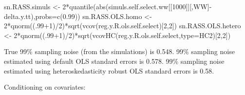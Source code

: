 \documentclass[
]{book}
\newenvironment{Shaded}{\begin{snugshade}}{\end{snugshade}}
\newcommand{\AttributeTok}[1]{\textcolor[rgb]{0.77,0.63,0.00}{#1}}
\newcommand{\DecValTok}[1]{\textcolor[rgb]{0.00,0.00,0.81}{#1}}
\newcommand{\FloatTok}[1]{\textcolor[rgb]{0.00,0.00,0.81}{#1}}
\newcommand{\FunctionTok}[1]{\textcolor[rgb]{0.00,0.00,0.00}{#1}}
\newcommand{\NormalTok}[1]{#1}
\newcommand{\OtherTok}[1]{\textcolor[rgb]{0.56,0.35,0.01}{#1}}
\newcommand{\SpecialCharTok}[1]{\textcolor[rgb]{0.00,0.00,0.00}{#1}}
\newcommand{\StringTok}[1]{\textcolor[rgb]{0.31,0.60,0.02}{#1}}
\theoremstyle{definition}
\theoremstyle{definition}
\theoremstyle{definition}
\theoremstyle{definition}
\theoremstyle{remark}
\begin{document}
\begin{Shaded}
\begin{Highlighting}[]
\NormalTok{sn.RASS.simuls }\OtherTok{\textless{}{-}} \DecValTok{2}\SpecialCharTok{*}\FunctionTok{quantile}\NormalTok{(}\FunctionTok{abs}\NormalTok{(simuls.self.select.ww[[}\StringTok{\textquotesingle{}1000\textquotesingle{}}\NormalTok{]][,}\StringTok{\textquotesingle{}WW\textquotesingle{}}\NormalTok{]}\SpecialCharTok{{-}}\NormalTok{delta.y.tt),}\AttributeTok{probs=}\FunctionTok{c}\NormalTok{(}\FloatTok{0.99}\NormalTok{))}
\NormalTok{sn.RASS.OLS.homo }\OtherTok{\textless{}{-}} \DecValTok{2}\SpecialCharTok{*}\FunctionTok{qnorm}\NormalTok{((.}\DecValTok{99}\SpecialCharTok{+}\DecValTok{1}\NormalTok{)}\SpecialCharTok{/}\DecValTok{2}\NormalTok{)}\SpecialCharTok{*}\FunctionTok{sqrt}\NormalTok{(}\FunctionTok{vcov}\NormalTok{(reg.y.R.ols.self.select)[}\DecValTok{2}\NormalTok{,}\DecValTok{2}\NormalTok{])}
\NormalTok{sn.RASS.OLS.hetero }\OtherTok{\textless{}{-}} \DecValTok{2}\SpecialCharTok{*}\FunctionTok{qnorm}\NormalTok{((.}\DecValTok{99}\SpecialCharTok{+}\DecValTok{1}\NormalTok{)}\SpecialCharTok{/}\DecValTok{2}\NormalTok{)}\SpecialCharTok{*}\FunctionTok{sqrt}\NormalTok{(}\FunctionTok{vcovHC}\NormalTok{(reg.y.R.ols.self.select,}\AttributeTok{type=}\StringTok{\textquotesingle{}HC2\textquotesingle{}}\NormalTok{)[}\DecValTok{2}\NormalTok{,}\DecValTok{2}\NormalTok{])}
\end{Highlighting}
\end{Shaded}

True 99\% sampling noise (from the simulations) is 0.548.
99\% sampling noise estimated using default OLS standard errors is 0.578.
99\% sampling noise estimated using heteroskedasticity robust OLS standard errors is 0.58.

Conditioning on covariates:
\end{document}
